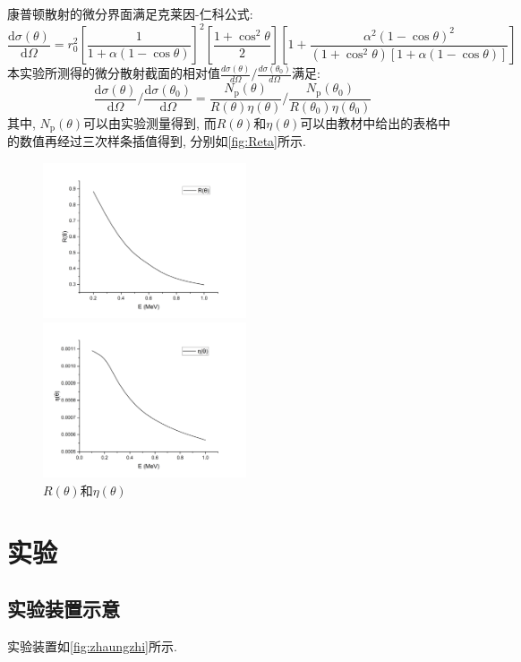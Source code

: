 \documentclass[font=default]{mpltx}
\begin{document}
康普顿散射的微分界面满足克莱因-仁科公式: 
$$ 
\frac{\mathrm{d}\sigma(\theta)}{\mathrm{d}\Omega} = r_0^2 \left[ \frac{1}{1 + \alpha(1 - \cos\theta)} \right]^2 \left[ \frac{1 + \cos^2\theta}{2} \right] \left[ 1 + \frac{\alpha^2(1 - \cos\theta)^2}{(1 + \cos^2\theta)\left[ 1 + \alpha(1 - \cos\theta) \right]} \right]
$$
本实验所测得的微分散射截面的相对值$\frac{d\sigma(\theta)}{d\Omega}/\frac{d\sigma(\theta_0)}{d\Omega}$满足: 
$$
\frac{\mathrm{d}\sigma(\theta)}{\mathrm{d}\Omega} \bigg/ \frac{\mathrm{d}\sigma(\theta_0)}{\mathrm{d}\Omega} = \frac{N_{\mathrm{p}}(\theta)}{R(\theta)\eta(\theta)} \bigg/ \frac{N_{\mathrm{p}}(\theta_0)}{R(\theta_0)\eta(\theta_0)}
$$
其中, $N_{\mathrm{p}}(\theta)$可以由实验测量得到, 
而$R(\theta)$和$\eta(\theta)$可以由教材\cite{jindaiwulishiyan}中给出的表格中的数值再经过三次样条插值得到, 分别如\autoref{fig:Reta}所示. 
\begin{figure}[htbp]
  \centering
  \begin{minipage}[t]{0.52\textwidth}
  \centering
  \includegraphics[width=6cm]{fig/R.png}
  \end{minipage}
  \begin{minipage}[t]{0.52\textwidth}
  \centering
  \includegraphics[width=6cm]{fig/yita.png}
  \end{minipage}
  \caption{$R(\theta)和\eta(\theta)$}
  \label{fig:Reta}
\end{figure}

\section{实验}
\subsection{实验装置示意}
实验装置如\autoref{fig:zhaungzhi}所示. 
\end{document}
